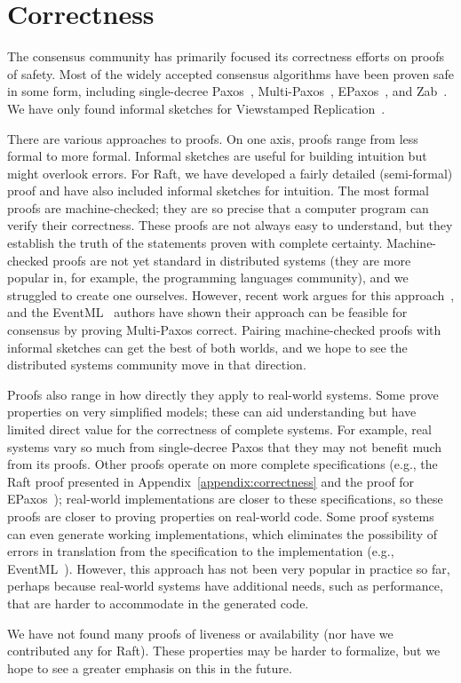 \section{Correctness}
\label{related:correctness}

The consensus community has primarily focused its correctness efforts on
proofs of safety. Most of the widely accepted consensus algorithms have
been proven safe in some form, including single-decree
Paxos~\cite{Lamport:1998,Prisco:2000,Lamport:2013e},
Multi-Paxos~\cite{Boichat:2003,Schiper:2014},
EPaxos~\cite{Moraru:2013tr}, and
Zab~\cite{Junqueira:2010}. We have only found informal sketches for
Viewstamped Replication~\cite{Liskov:2012}.

There are various approaches to proofs. On one axis, proofs range from
less formal to more formal. Informal sketches are useful for building intuition
but might overlook errors. 
For Raft, we have developed a fairly detailed (semi-formal) proof and
have also included informal sketches for intuition.
The most formal proofs are machine-checked; they are so precise that a
computer program can verify their correctness.
These proofs are not always easy to understand, but they
establish the truth of the statements proven with complete certainty.
Machine-checked proofs are not yet standard in distributed systems (they
are more popular in, for example, the programming languages community),
and we struggled to create one ourselves.
However, recent work argues for this
approach~\cite{Lamport:2011,Schiper:2014}, and the
EventML~\cite{Schiper:2014} authors have shown their approach can be
feasible for consensus by proving Multi-Paxos correct. Pairing
machine-checked proofs with informal sketches can get the best of both
worlds, and we hope to see the distributed systems community move in
that direction.

Proofs also range in how directly they apply to real-world systems. Some
prove properties on very simplified models; these can aid understanding
but have limited direct value for the correctness of complete systems.
For example, real systems vary so much from single-decree Paxos that
they may not benefit much from its proofs. Other proofs operate on more
complete specifications (e.g., the Raft proof presented in
Appendix~\ref{appendix:correctness} and the proof for
EPaxos~\cite{Moraru:2013tr}); real-world implementations are
closer to these specifications, so these proofs are closer to proving
properties on real-world code. Some proof systems can even generate
working implementations, which eliminates the possibility of errors in
translation from the specification to the implementation (e.g.,
EventML~\cite{Schiper:2014}). However, this approach has not been very
popular in practice so far, perhaps because real-world systems have
additional needs, such as performance, that are harder to accommodate in
the generated code.

We have not found many proofs of liveness or availability (nor have we
contributed any for Raft). These properties may be harder to formalize,
but we hope to see a greater emphasis on this in the future.
